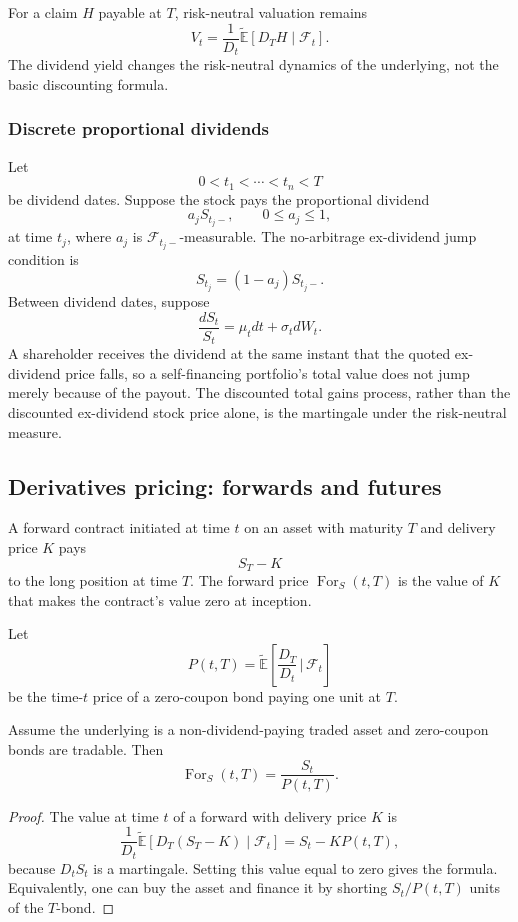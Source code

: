 For a claim $H$ payable at $T$, risk-neutral valuation remains
\[
V_t
=\frac{1}{D_t}\widetilde{\mathbb{E}}[D_TH\mid\mathcal{F}_t].
\]
The dividend yield changes the risk-neutral dynamics of the underlying, not the basic discounting formula.

\subsubsection*{Discrete proportional dividends}

Let
\[
0<t_1<\cdots<t_n<T
\]
be dividend dates. Suppose the stock pays the proportional dividend
\[
a_jS_{t_j-},
\qquad 0\leq a_j\leq1,
\]
at time $t_j$, where $a_j$ is $\mathcal{F}_{t_j-}$-measurable. The no-arbitrage ex-dividend jump condition is
\[
S_{t_j}=(1-a_j)S_{t_j-}.
\]
Between dividend dates, suppose
\[
\frac{dS_t}{S_t}=\mu_tdt+\sigma_tdW_t.
\]
A shareholder receives the dividend at the same instant that the quoted ex-dividend price falls, so a self-financing portfolio's total value does not jump merely because of the payout. The discounted total gains process, rather than the discounted ex-dividend stock price alone, is the martingale under the risk-neutral measure.

\subsection{Derivatives pricing: forwards and futures}

\begin{de}
A forward contract initiated at time $t$ on an asset with maturity $T$ and delivery price $K$ pays
\[
S_T-K
\]
to the long position at time $T$. The forward price $\operatorname{For}_S(t,T)$ is the value of $K$ that makes the contract's value zero at inception.
\end{de}

Let
\[
P(t,T)
=\widetilde{\mathbb{E}}\!\left[
\frac{D_T}{D_t}\,\bigg|\,\mathcal{F}_t
\right]
\]
be the time-$t$ price of a zero-coupon bond paying one unit at $T$.

\begin{thm}
Assume the underlying is a non-dividend-paying traded asset and zero-coupon bonds are tradable. Then
\[
\boxed{\operatorname{For}_S(t,T)=\frac{S_t}{P(t,T)}.}
\]
\end{thm}

\begin{proof}
The value at time $t$ of a forward with delivery price $K$ is
\[
\frac{1}{D_t}
\widetilde{\mathbb{E}}[D_T(S_T-K)\mid\mathcal{F}_t]
=S_t-KP(t,T),
\]
because $D_tS_t$ is a martingale. Setting this value equal to zero gives the formula. Equivalently, one can buy the asset and finance it by shorting $S_t/P(t,T)$ units of the $T$-bond.
\end{proof}

